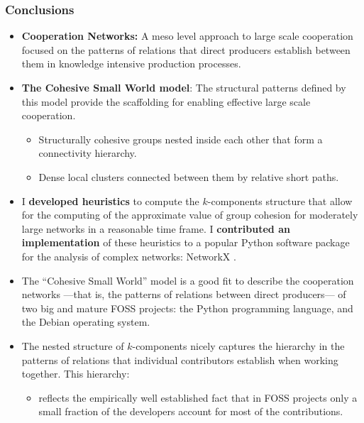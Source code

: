 \documentclass[ignorenonframetext,red,8pt,notes=show]{beamer}
\begin{document}

\begin{frame}
\frametitle{Conclusions}

\begin{itemize}

\item \textbf{Cooperation Networks:} A meso level approach to large scale cooperation focused on the patterns of relations that direct producers establish between them in knowledge intensive production processes.

\item \textbf{The Cohesive Small World model}: The structural patterns defined by this model provide the scaffolding for enabling effective large scale cooperation.

\begin{itemize}
\item Structurally cohesive groups nested inside each other that form a connectivity hierarchy.

\item Dense local clusters connected between them by relative short paths.
\end{itemize}

\item I \textbf{developed heuristics} to compute the $k$-components structure that allow for the computing of the approximate value of group cohesion for moderately large networks in a reasonable time frame. I \textbf{contributed an implementation} of these heuristics to a popular Python software package for the analysis of complex networks: NetworkX \citep{hagberg:2008}.

\item The ``Cohesive Small World'' model is a good fit to describe the cooperation networks ---that is, the patterns of relations between direct producers--- of two big and mature FOSS projects: the Python programming language, and the Debian operating system.

\item The nested structure of $k$-components nicely captures the hierarchy in the patterns of relations that individual contributors establish when working together. This hierarchy:

\begin{itemize}
\item reflects the empirically well established fact that in FOSS projects only a small fraction of the developers account for most of the contributions.


\end{itemize}
\end{itemize}
\end{frame}
\end{document}

